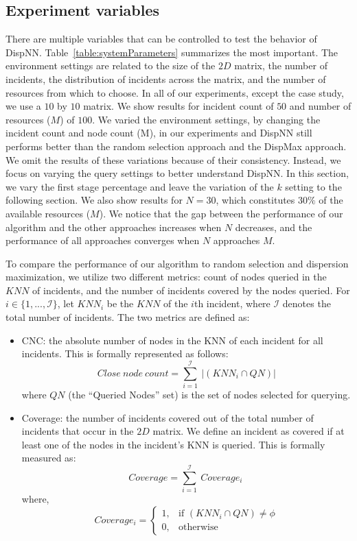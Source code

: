 \documentclass{acm_proc_article-sp}
\begin{document}
\subsection{Experiment variables}
There are multiple variables that can be controlled to test the behavior of DispNN. Table~\ref{table:systemParameters} summarizes the most important.
The environment settings are related to the size of the $2D$ matrix, the number of incidents, the distribution of incidents across the matrix, and the number of resources from which to choose. In all of our experiments, except the case study, we use a $10$ by $10$ matrix. We show results for incident count of $50$ and number of resources ($M$) of $100$.
We varied the environment settings, by changing the incident count and node count (M), in our experiments and DispNN still performs better than the random selection approach and the DispMax approach. We omit the results of these variations because of their consistency. Instead, we focus on varying the query settings to better understand DispNN. In this section, we vary the first stage percentage and leave the variation of the $k$ setting to the following section. We also show results for $N = 30$, which constitutes $30\%$ of the available resources ($M$). We notice that the gap between the performance of our algorithm and the other approaches increases when $N$ decreases, and the performance of all approaches converges when $N$ approaches $M$. \par

To compare the performance of our algorithm to random selection and dispersion maximization, we utilize two different metrics: count of nodes queried in the $KNN$ of incidents, and the number of incidents covered by the nodes queried. For $i \in \{1, ...,\mathcal{I}\}$, let $KNN_i$ be the $KNN$ of the $i$th incident, where $\mathcal{I}$ denotes the total number of incidents. The two metrics are defined as:
\begin{itemize}
\item CNC: the absolute number of nodes in the KNN of each incident for all incidents. This is formally represented as follows:
\begin{equation}
Close\ node\ count = \sum\limits_{ i = 1}^\mathcal{I}\ |(KNN_i \cap {QN})|
\end{equation}
where $QN$ (the ``Queried Nodes'' set) is the set of nodes selected for querying.
\item Coverage: the number of incidents covered out of the total number of incidents that occur in the $2D$ matrix. We define an incident as covered if at least one of the nodes in the incident's KNN is queried. This is formally measured as:
\begin{equation}
Coverage =  \sum\limits_{ i = 1}^\mathcal{I}\ Coverage_i\ 
\end{equation}
where,
\[
Coverage_i =
\begin{cases}
1,& \text{if }(KNN_i \cap {QN}) \neq \phi\\
0,              & \text{otherwise}
\end{cases}
\]
\end{itemize}
\end{document}
